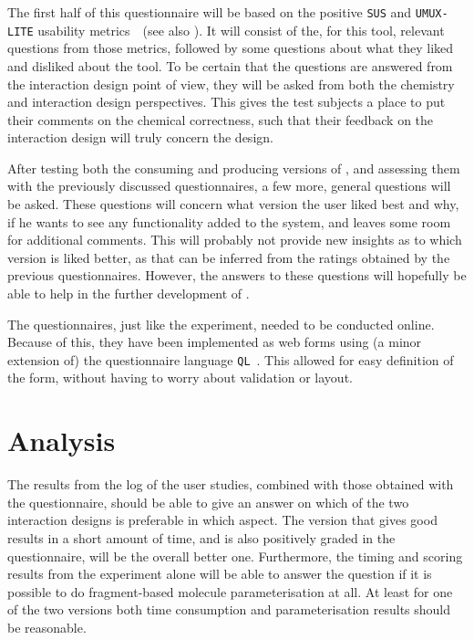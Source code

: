 The first half of this questionnaire will be based on the positive \verb|SUS| and \verb|UMUX-LITE| usability metrics~\cite{lewis2013umux}~(see also ). It will consist of the, for this tool, relevant questions from those metrics, followed by some questions about what they liked and disliked about the tool. To be certain that the questions are answered from the interaction design point of view, they will be asked from both the chemistry and interaction design perspectives. This gives the test subjects a place to put their comments on the chemical correctness, such that their feedback on the interaction design will truly concern the design.

After testing both the consuming and producing versions of \oframp, and assessing them with the previously discussed questionnaires, a few more, general questions will be asked. These questions will concern what version the user liked best and why, if he wants to see any functionality added to the system, and leaves some room for additional comments. This will probably not provide new insights as to which version is liked better, as that can be inferred from the ratings obtained by the previous questionnaires. However, the answers to these questions will hopefully be able to help in the further development of \oframp.

The questionnaires, just like the experiment, needed to be conducted online. Because of this, they have been implemented as web forms using (a minor extension of) the questionnaire language \verb|QL|~\cite{erdweg2013state}. This allowed for easy definition of the form, without having to worry about validation or layout.



\section{Analysis}
The results from the log of the user studies, combined with those obtained with the questionnaire, should be able to give an answer on which of the two interaction designs is preferable in which aspect. The version that gives good results in a short amount of time, and is also positively graded in the questionnaire, will be the overall better one. Furthermore, the timing and scoring results from the experiment alone will be able to answer the question if it is possible to do fragment-based molecule parameterisation at all. At least for one of the two versions both time consumption and parameterisation results should be reasonable.

